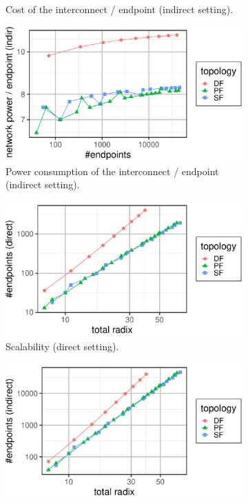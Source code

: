 \begin{figure}[t]
\begin{subfigure}[t]{0.49 \textwidth}
%
\caption{\textmd{Cost of the interconnect / endpoint (indirect setting).}}
\label{fig:cost-total}
\end{subfigure}
\begin{subfigure}[t]{0.49 \textwidth}
\centering
\includegraphics[width=1.0\columnwidth]{../../../plots/plot_power_per_endpoint_indirect.pdf}
%
\caption{\textmd{Power consumption of the interconnect / endpoint (indirect setting).}}
\label{fig:power-total}
\end{subfigure}
\vspace{1em}
%
%
%
\begin{subfigure}[t]{0.49 \textwidth}
\centering
\includegraphics[width=1.0\columnwidth]{../../../plots/plot_scalability_direct.pdf}
%
\caption{\textmd{Scalability (direct setting).}}
\label{fig:cost-total}
\end{subfigure}
\begin{subfigure}[t]{0.49 \textwidth}
\centering
\includegraphics[width=1.0\columnwidth]{../../../plots/plot_scalability_indirect.pdf}

\end{subfigure}
\end{figure}
